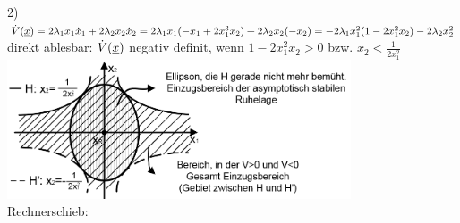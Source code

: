 \documentclass[openany,a4paper,11pt]{book}
\begin{document}
\begin{enumerate}
    2) $\dot{V}(\uline{x})=2\lambda_1x_1\dot{x}_1+2\lambda_2x_2\dot{x}_2=2\lambda_1x_1(-x_1+2x_1^3x_2)+2\lambda_2x_2(-x_2)=-2\lambda_1x_1^2(1-2x_1^2x_2)-2\lambda_2x_2^2$\\
    direkt ablesbar: $\dot{V}(\uline{x})$ negativ definit, wenn $1-2x_1^2x_2>0$ bzw. $x_2<\frac{1}{2x_1^2}$\\
    \includegraphics[width=4in]{imgs/NLR42.png}\\
    Rechnerschieb: 
\end{enumerate}
\end{document}
